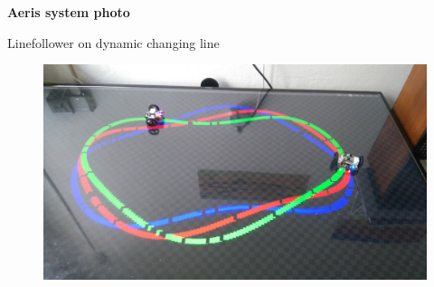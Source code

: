 \documentclass[xcolor=dvipsnames]{beamer}
\begin{document}
\begin{frame}{\bf Aeris system photo}

Linefollower on dynamic changing line

\begin{figure}[!htb]
\centering
\includegraphics[scale=.07]{../pictures/line_follower.jpg}
\end{figure}

\end{frame}
\end{document}
